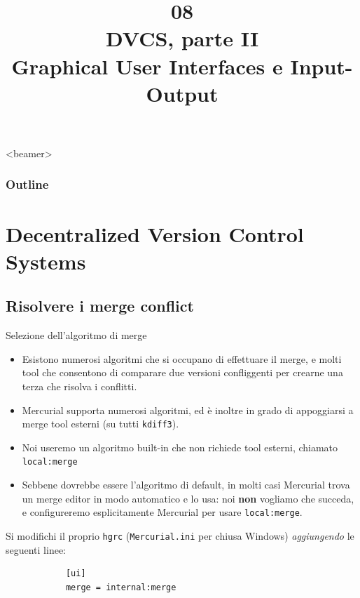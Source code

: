 \documentclass[presentation]{beamer}
\title[OOP08 -- DCVS, GUI e IO]{08 \\ DVCS, parte II \\ Graphical User Interfaces e Input-Output}
\begin{document}
\frame[label=coverpage]{\titlepage}

\begin{frame}<beamer>
 	\frametitle{Outline}
 	\tableofcontents[]
\end{frame}

\section{Decentralized Version Control Systems}

\subsection{Risolvere i merge conflict}


\begin{frame}[fragile]{Selezione dell'algoritmo di merge}
	\begin{itemize}
		\item Esistono numerosi algoritmi che si occupano di effettuare il merge, e molti tool che consentono di comparare due versioni confliggenti per crearne una terza che risolva i conflitti.
		\item Mercurial supporta numerosi algoritmi, ed è inoltre in grado di appoggiarsi a merge tool esterni (su tutti \texttt{kdiff3}).
		\item Noi useremo un algoritmo built-in che non richiede tool esterni, chiamato \texttt{local:merge}
		\item Sebbene dovrebbe essere l'algoritmo di default, in molti casi Mercurial trova un merge editor in modo automatico e lo usa: noi \textbf{non} vogliamo che succeda, e configureremo esplicitamente Mercurial per usare \texttt{local:merge}.
	\end{itemize}
	Si modifichi il proprio \texttt{hgrc} (\texttt{Mercurial.ini} per chiusa Windows) \emph{aggiungendo} le seguenti linee:
	\begin{block}{}
		\begin{verbatim}
			[ui]
			merge = internal:merge
		\end{verbatim}
	\end{block}
\end{frame}
\end{document}
